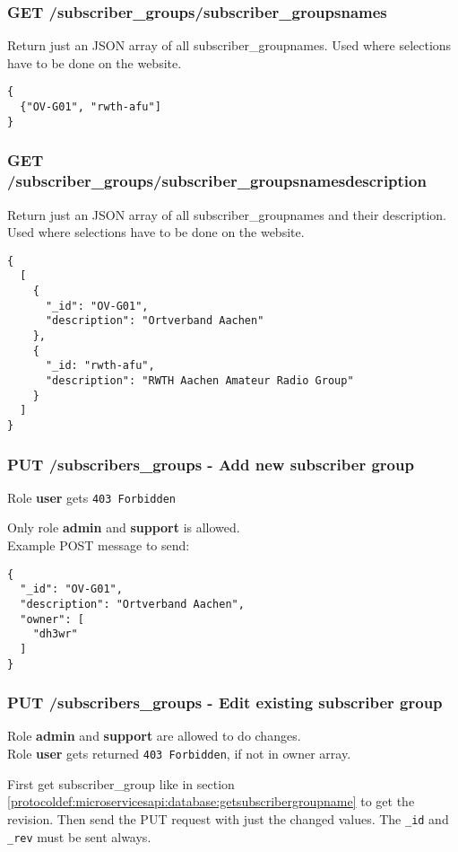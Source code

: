\subsubsection{GET /subscriber\_groups/subscriber\_groupsnames}
Return just an JSON array of all subscriber\_groupnames. Used where selections have to be done on the website.
\begin{lstlisting}
{
  {"OV-G01", "rwth-afu"]
}
\end{lstlisting}

\subsubsection{GET /subscriber\_groups/subscriber\_groupsnamesdescription}
Return just an JSON array of all subscriber\_groupnames and their description. Used where selections have to be done on the website.
\begin{lstlisting}
{
  [
    {
      "_id": "OV-G01",
      "description": "Ortverband Aachen"
    },
    {
      "_id: "rwth-afu",
      "description": "RWTH Aachen Amateur Radio Group"
    }
  ]      
}
\end{lstlisting}

\subsubsection{PUT /subscribers\_groups - Add new subscriber group}

Role \textbf{user} gets \verb|403 Forbidden|

Only role \textbf{admin} and \textbf{support} is allowed.\\
Example POST message to send:
\begin{lstlisting}
{
  "_id": "OV-G01",
  "description": "Ortverband Aachen",
  "owner": [
    "dh3wr"
  ]
}
\end{lstlisting}

\subsubsection{PUT /subscribers\_groups - Edit existing subscriber group}
Role \textbf{admin} and \textbf{support} are allowed to do changes.\\
Role \textbf{user} gets returned \verb|403 Forbidden|, if not in owner array.

First get subscriber\_group like in section \ref{protocoldef:microservicesapi:database:getsubscribergroupname} to get the revision. Then send the PUT request with just the changed values. The \verb|_id| and \verb|_rev| must be sent always.

